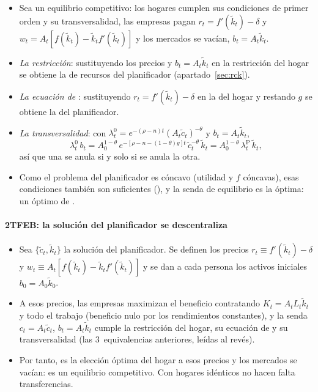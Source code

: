 \documentclass[11pt]{article}
\begin{document}
\begin{itemize}
\item Sea un equilibrio competitivo: los hogares cumplen sus condiciones de primer orden y su transversalidad, las empresas pagan $r_t=f'(\tilde k_t)-\delta$ y $w_t=A_t[f(\tilde k_t)-\tilde k_tf'(\tilde k_t)]$ y los mercados se vacían, $b_t=A_t\tilde k_t$.
\item \emph{La restricción}: sustituyendo los precios y $b_t=A_t\tilde k_t$ en la restricción del hogar se obtiene la de recursos del planificador (apartado~\ref{sec:rck}).
\item \emph{La ecuación de }: sustituyendo $r_t=f'(\tilde k_t)-\delta$ en la del hogar y restando $g$ se obtiene la del planificador.
\item \emph{La transversalidad}: con $\lambda^0_t=e^{-(\rho-n)t}(A_t\tilde c_t)^{-\theta}$ y $b_t=A_t\tilde k_t$,
  \[\lambda^0_t\,b_t=A_0^{1-\theta}\,e^{-[\rho-n-(1-\theta)g]t}\,\tilde c_t^{-\theta}\,\tilde k_t=A_0^{1-\theta}\,\lambda^{\mathrm{P}}_t\,\tilde k_t,\]
  así que una se anula si y solo si se anula la otra.
\item Como el problema del planificador es cóncavo (utilidad y $f$ cóncavas), esas condiciones también son suficientes (), y la senda de equilibrio es la óptima: un óptimo de . \findemo
\end{itemize}

\paragraph{2TFEB: la solución del planificador se descentraliza}

\begin{itemize}
\item Sea $\{\tilde c_t,\tilde k_t\}$ la solución del planificador. Se definen los precios $r_t\equiv f'(\tilde k_t)-\delta$ y $w_t\equiv A_t[f(\tilde k_t)-\tilde k_tf'(\tilde k_t)]$ y se dan a cada persona los activos iniciales $b_0=A_0\tilde k_0$.
\item A esos precios, las empresas maximizan el beneficio contratando $K_t=A_tL_t\tilde k_t$ y todo el trabajo (beneficio nulo por los rendimientos constantes), y la senda $c_t=A_t\tilde c_t$, $b_t=A_t\tilde k_t$ cumple la restricción del hogar, su ecuación de  y su transversalidad (las 3~equivalencias anteriores, leídas al revés).
\item Por tanto, es la elección óptima del hogar a esos precios y los mercados se vacían: es un equilibrio competitivo. Con hogares idénticos no hacen falta transferencias. \findemo
\end{itemize}
\end{document}

